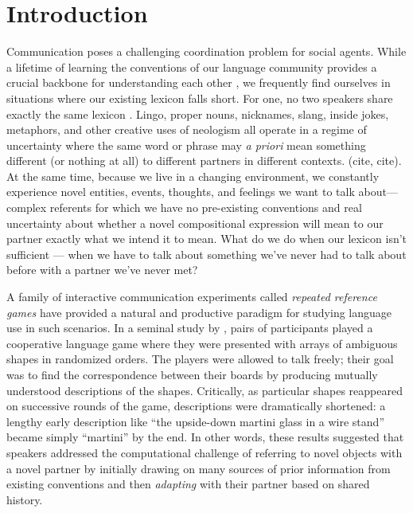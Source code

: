 \documentclass[alpha-refs]{wiley-article}
\begin{document}
\section{Introduction}\label{introduction}

Communication poses a challenging coordination problem for social agents. 
While a lifetime of learning the conventions of our language community provides a crucial backbone for understanding each other \citep{lewisConventionPhilosophicalStudy1969}, we frequently find ourselves in situations where our existing lexicon falls short.
For one, no two speakers share exactly the same lexicon \citep{Davidson86_DerangementOfEpitaphs, clarkCommunalLexicons1998}. 
Lingo, proper nouns, nicknames, slang, inside jokes, metaphors, and other creative uses of neologism all operate in a regime of uncertainty where the same word or phrase may \emph{a priori} mean something different (or nothing at all) to different partners in different contexts. (cite, cite).
At the same time, because we live in a changing environment, we constantly experience novel entities, events, thoughts, and feelings we want to talk about---complex referents for which we have no pre-existing conventions and real uncertainty about whether a novel compositional expression will mean to our partner exactly what we intend it to mean.
What do we do when our lexicon isn't sufficient --- when we have to talk about something we've never had to talk about before with a partner we've never met?

A family of interactive communication experiments called \emph{repeated reference games} have provided a natural and productive paradigm for studying language use in such scenarios. In a seminal study by \cite{KraussWeinheimer64_ReferencePhrases}, pairs of participants played a cooperative language game where they were presented with arrays of ambiguous shapes in randomized orders. 
The players were allowed to talk freely; their goal was to find the correspondence between their boards by producing mutually understood descriptions of the shapes. 
Critically, as particular shapes reappeared on successive rounds of the game, descriptions were dramatically shortened: a lengthy early description like ``the upside-down martini glass in a wire stand'' became simply ``martini'' by the end. 
In other words, these results suggested that speakers addressed the computational challenge of referring to novel objects with a novel partner by initially drawing on many sources of prior information from existing conventions and then \emph{adapting} with their partner based on shared history.
\end{document}

